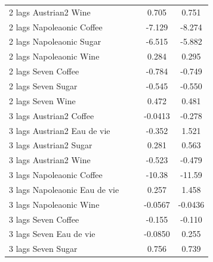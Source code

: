 \documentclass[12pt,a4paper,titlepage]{article}
\begin{document}
{\begin{longtable}{l*{4}{c}}
2 lags Austrian2 Wine&                     &                     &       0.705\sym{**} &       0.751\sym{**} \\
2 lags Napoleaonic Coffee&                     &                     &      -7.129\sym{***}&      -8.274\sym{***}\\
2 lags Napoleaonic Sugar&                     &                     &      -6.515\sym{***}&      -5.882\sym{***}\\
2 lags Napoleaonic Wine&                     &                     &       0.284         &       0.295         \\
2 lags Seven Coffee &                     &                     &      -0.784\sym{***}&      -0.749\sym{***}\\
2 lags Seven Sugar  &                     &                     &      -0.545\sym{***}&      -0.550\sym{***}\\
2 lags Seven Wine   &                     &                     &       0.472\sym{***}&       0.481\sym{***}\\
3 lags Austrian2 Coffee&                     &                     &     -0.0413         &      -0.278         \\
3 lags Austrian2 Eau de vie&                     &                     &      -0.352         &       1.521         \\
3 lags Austrian2 Sugar&                     &                     &       0.281\sym{*}  &       0.563         \\
3 lags Austrian2 Wine&                     &                     &      -0.523\sym{*}  &      -0.479\sym{*}  \\
3 lags Napoleaonic Coffee&                     &                     &      -10.38\sym{***}&      -11.59\sym{***}\\
3 lags Napoleaonic Eau de vie&                     &                     &       0.257         &       1.458         \\
3 lags Napoleaonic Wine&                     &                     &     -0.0567         &     -0.0436         \\
3 lags Seven Coffee &                     &                     &      -0.155         &      -0.110         \\
3 lags Seven Eau de vie&                     &                     &     -0.0850         &       0.255         \\
3 lags Seven Sugar  &                     &                     &       0.756\sym{***}&       0.739\sym{***}\\

\end{longtable}}
\end{document}

